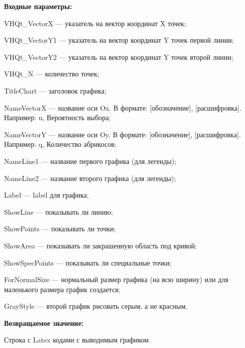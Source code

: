 \textbf{Входные параметры:}
 
VHQt\_VectorX --- указатель на вектор координат X точек;
 
VHQt\_VectorY1 --- указатель на вектор координат Y точек первой линии;
 
VHQt\_VectorY2 --- указатель на вектор координат Y точек второй линии;
 
VHQt\_N --- количество точек;
 
TitleChart --- заголовок графика;
 
NameVectorX --- название оси Ox. В формате: [обозначение], [расшифровка]. Например: u, Вероятность выбора;
 
NameVectorY --- название оси Oy. В формате: [обозначение], [расшифровка]. Например: q, Количество абрикосов;
 
NameLine1 --- название первого графика (для легенды);
 
NameLine2 --- название второго графика (для легенды);
 
Label --- label для графика;
 
ShowLine --- показывать ли линию;
 
ShowPoints --- показывать ли точки;
 
ShowArea --- показывать ли закрашенную область под кривой;
 
ShowSpecPoints --- показывать ли специальные точки;
 
ForNormalSize --- нормальный размер графика (на всю ширину) или для маленького размера график создается;
 
GrayStyle --- второй график рисовать серым, а не красным.
	
\textbf{Возвращаемое значение:}

Строка с Latex кодами с выводимым графиком.